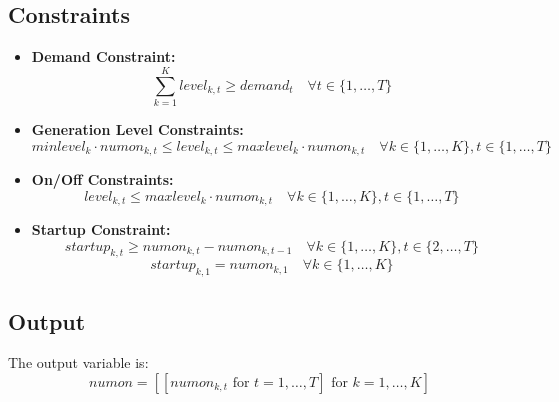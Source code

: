 \documentclass{article}
\begin{document}
\subsection*{Constraints}
\begin{itemize}
    \item \textbf{Demand Constraint:}
    \[
    \sum_{k=1}^{K} level_{k,t} \geq demand_t \quad \forall t \in \{1, \ldots, T\}
    \]
    
    \item \textbf{Generation Level Constraints:}
    \[
    minlevel_k \cdot numon_{k,t} \leq level_{k,t} \leq maxlevel_k \cdot numon_{k,t} \quad \forall k \in \{1, \ldots, K\}, t \in \{1, \ldots, T\}
    \]
    
    \item \textbf{On/Off Constraints:}
    \[
    level_{k,t} \leq maxlevel_k \cdot numon_{k,t} \quad \forall k \in \{1, \ldots, K\}, t \in \{1, \ldots, T\}
    \]
    
    \item \textbf{Startup Constraint:}
    \[
    startup_{k,t} \geq numon_{k,t} - numon_{k,t-1} \quad \forall k \in \{1, \ldots, K\}, t \in \{2, \ldots, T\}
    \]
    \[
    startup_{k,1} = numon_{k,1} \quad \forall k \in \{1, \ldots, K\}
    \]
\end{itemize}

\subsection*{Output}
The output variable is:
\[
numon = \left[\left[numon_{k,t} \text{ for } t = 1, \ldots, T\right] \text{ for } k = 1, \ldots, K\right]
\]
\end{document}

